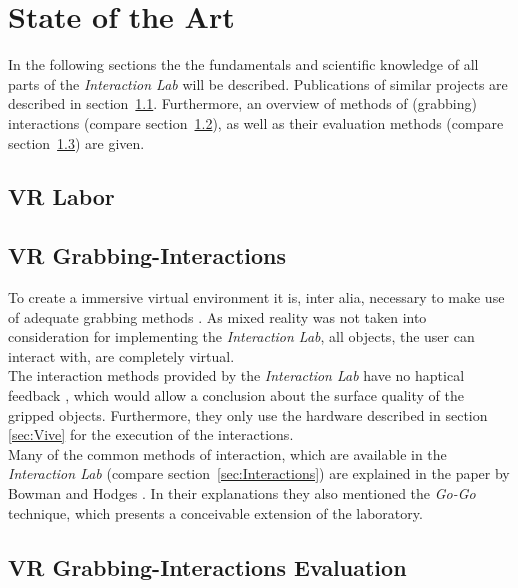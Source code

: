 \section{State of the Art} \label{sec:StateOfTheArt}
In the following sections the the fundamentals and scientific knowledge of all parts of the \textit{Interaction Lab} will be described. Publications of similar projects are described in section~\ref{sec:SOTALabor}. Furthermore, an overview of methods of  (grabbing) interactions (compare section~\ref{sec:SOTAInteractions}), as well as their evaluation methods (compare section~\ref{sec:SOTAInteractionEvalutiom}) are given. 


\subsection{VR Labor}\label{sec:SOTALabor}

\subsection{VR Grabbing-Interactions}\label{sec:SOTAInteractions}
To create a immersive virtual environment it is, inter alia, necessary to make use of adequate grabbing methods \cite{Bowman}. As mixed reality was not taken into consideration for implementing the \textit{Interaction Lab}, all objects, the user can interact with, are completely virtual. \\
The interaction methods provided by the \textit{Interaction Lab} have no haptical feedback \cite{768179}, which would allow a conclusion about the surface quality of the gripped objects. Furthermore, they only use the hardware described in section \ref{sec:Vive} for the execution of the interactions. \\
Many of the common methods of interaction, which are available in the \textit{Interaction Lab} (compare section~\ref {sec:Interactions}) are explained in the paper by Bowman and Hodges \cite{Bowman}. In their explanations they also mentioned the  \textit{Go-Go} technique, which presents a conceivable extension of the laboratory.

\subsection{VR Grabbing-Interactions Evaluation}\label{sec:SOTAInteractionEvalutiom}

\newpage
